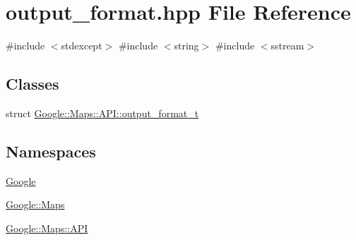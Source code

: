 \hypertarget{a00026}{}\section{output\+\_\+format.\+hpp File Reference}
\label{a00026}
{\ttfamily \#include $<$stdexcept$>$}\newline
{\ttfamily \#include $<$string$>$}\newline
{\ttfamily \#include $<$sstream$>$}\newline
\subsection*{Classes}
\begin{DoxyCompactItemize}
\item 
struct \hyperlink{a00055}{Google\+::\+Maps\+::\+A\+P\+I\+::output\+\_\+format\+\_\+t}
\end{DoxyCompactItemize}
\subsection*{Namespaces}
\begin{DoxyCompactItemize}
\item 
 \hyperlink{a00038}{Google}
\item 
 \hyperlink{a00039}{Google\+::\+Maps}
\item 
 \hyperlink{a00040}{Google\+::\+Maps\+::\+A\+PI}
\end{DoxyCompactItemize}
